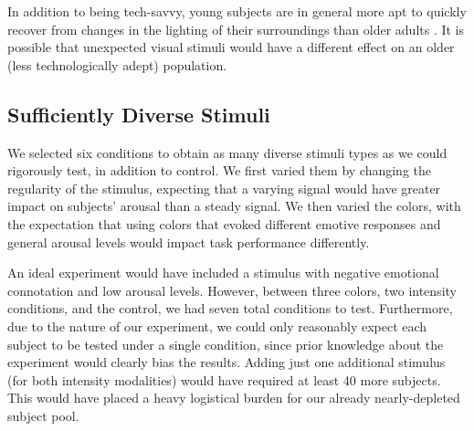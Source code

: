\documentclass{llncs}
\begin{document}

In addition to being tech-savvy, young subjects are in general more apt to quickly recover
from changes in the lighting of their surroundings than older adults \cite{kline_vision_1985}.
It is possible that unexpected visual stimuli would have a 
different effect on an older (less technologically adept) population. 


\subsection{Sufficiently Diverse Stimuli} \label{divstim}
%
We selected six conditions to obtain as 
many diverse stimuli types as we could rigorously test, in addition to control. 
We first varied them by changing the regularity of the stimulus, 
expecting that a varying signal would have greater impact on 
subjects' arousal than a steady signal. We then varied the colors, with 
the expectation that using colors that evoked different emotive responses 
and general arousal levels would impact task performance differently. 

An ideal experiment would have included a stimulus with negative emotional 
connotation and low arousal levels. However, between three colors,
two intensity conditions, and the control, we had seven total conditions to test. 
Furthermore, due to the nature of our experiment, we could only reasonably 
expect each subject to be tested under a single condition, since prior knowledge about		 	
the experiment would clearly bias the results. 
Adding just one additional stimulus (for both intensity modalities) would have required at least 
40 more subjects. This would have placed a heavy logistical burden for our 
already nearly-depleted subject pool.
\end{document}
